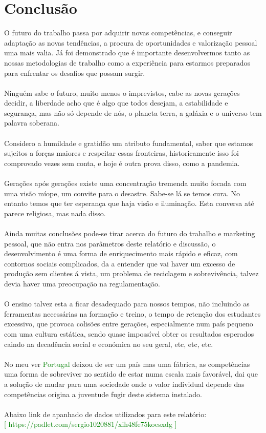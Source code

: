 \section{Conclusão}
\qquad O futuro do trabalho passa por adquirir novas competências, e conseguir adaptação as novas tendências, a procura de oportunidades e valorização pessoal uma mais valia. Já foi demonstrado que é importante desenvolvermos tanto as nossas metodologias de trabalho como a experiência para estarmos preparados para enfrentar os desafios que possam surgir. \\
\\
Ninguém sabe o futuro, muito menos o imprevistos, cabe as novas gerações decidir, a liberdade acho que é algo que todos desejam, a estabilidade e segurança, mas não só depende de nós, o planeta terra, a galáxia e o universo tem palavra soberana.\\
\\
Considero a humildade e gratidão um atributo fundamental, saber que estamos sujeitos a forças maiores e respeitar essas fronteiras, historicamente isso foi comprovado vezes sem conta, e hoje é outra prova disso, como a pandemia.\\
\\
Gerações após gerações existe uma concentração tremenda muito focada com uma visão míope, um convite para o desastre. Sabe-se lá se temos cura. No entanto temos que ter esperança que haja visão e iluminação.
Esta conversa até parece religiosa, mas nada disso.\\
\\
Ainda muitas conclusões pode-se tirar acerca do futuro do trabalho e marketing pessoal, que não entra nos parâmetros deste relatório e discussão, o desenvolvimento é uma forma de enriquecimento mais rápido e eficaz, com contornos sociais complicados, da a entender que vai haver um excesso de produção sem clientes á vista, um problema de reciclagem e sobrevivência, talvez devia haver uma preocupação na  regulamentação.\\
\\
O ensino talvez esta a ficar desadequado para nossos tempos, não incluindo as ferramentas necessárias na formação e treino, o tempo de retenção dos estudantes excessivo, que provoca colisões entre gerações, especialmente num país pequeno com uma cultura estática, sendo quase impossível obter os resultados esperados caindo na decadência social e económica no seu geral, etc, etc, etc.\\
\\
No meu ver \textcolor{green}{Portugal} deixou de ser um país mas uma fábrica, as competências uma forma de sobreviver no sentido de estar numa escala mais favorável, dai que a solução de mudar para uma sociedade onde o valor individual depende das competências origina a juventude fugir deste sistema instalado.\\
\\
Abaixo link de apanhado de dados utilizados para este relatório:\\ \textcolor{green}{\small [ https://padlet.com/sergio1020881/xih48fe75koesxdg ]}
